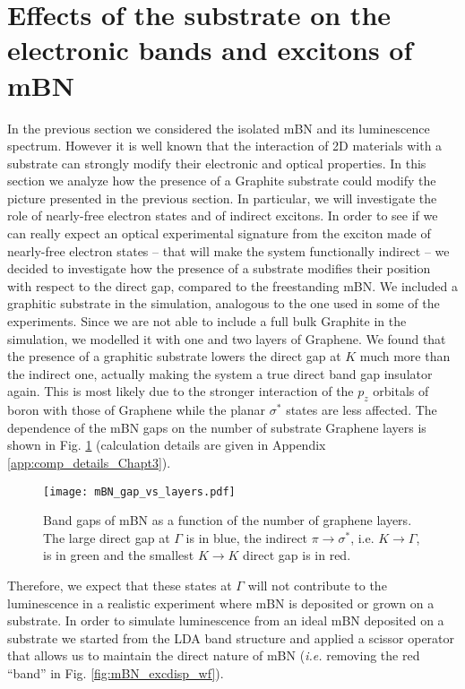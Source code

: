 %
\section{Effects of the substrate on the electronic bands and excitons of mBN} \label{sec:substrate}
In the previous section we considered the isolated \acrshort{mBN} and its luminescence spectrum. However it is well known that the interaction of 2D materials with a substrate can strongly modify their electronic and optical properties. In this section we analyze how the presence of a Graphite substrate could modify the picture presented in the previous section. In particular, we will investigate the role of nearly-free electron states and of indirect excitons.
In order to see if we can really expect an optical experimental signature from the exciton made of nearly-free electron states -- that will make the system functionally indirect -- we decided to investigate how the presence of a substrate modifies their position with respect to the direct gap, compared to the freestanding mBN. We included a graphitic substrate in the simulation, analogous to the one used in some of the experiments. Since we are not able to include a full bulk Graphite in the simulation, we modelled it with one and two layers of Graphene. We found that the presence of a graphitic substrate lowers the direct gap at $K$ much more than the indirect one, actually making the system a true direct band gap insulator again. This is most likely due to the stronger interaction of the $p_z$ orbitals of boron with those of Graphene while the planar $\sigma^*$ states are less affected. The dependence of the mBN gaps on the number of substrate Graphene layers is shown in Fig. \ref{fig:mBN_gap_layers} (calculation details are given in Appendix \ref{app:comp_details_Chapt3}). 
\begin{figure}[H]
	\vspace{0.2cm}
	\setcapindent{2em}
	\centering
	\texttt{[image: mBN\_gap\_vs\_layers.pdf]}
	\caption{Band gaps of mBN as a function of the number of graphene layers\label{gap_vs_layers}. The large direct gap at $\Gamma$ is in blue, the indirect $\pi\rightarrow\sigma^*$, i.e. $K\rightarrow\Gamma$, is in green and the smallest $K\rightarrow K$ direct gap is in red.} %
	\label{fig:mBN_gap_layers}
\end{figure}
Therefore, we expect that these states at $\Gamma$ will not contribute to the luminescence in a realistic experiment where mBN is deposited or grown on a substrate.
In order to simulate luminescence from an ideal mBN deposited on a substrate we started from the LDA band structure and applied a scissor operator that allows us to maintain the direct nature of mBN (\textit{i.e.} removing the red ``band'' in Fig. \ref{fig:mBN_excdisp_wf}). 



